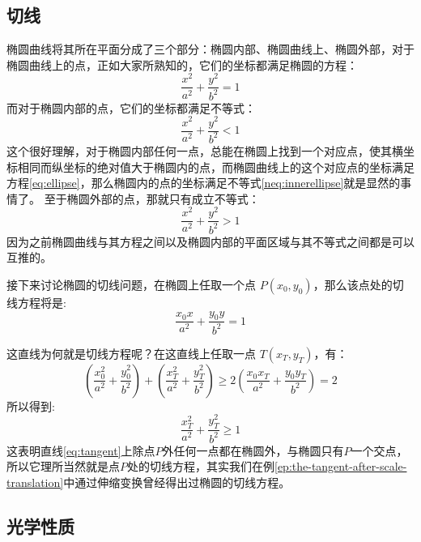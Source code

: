 \subsection{切线}
\label{sec:oval-tangent}

椭圆曲线将其所在平面分成了三个部分：椭圆内部、椭圆曲线上、椭圆外部，对于椭圆曲线上的点，正如大家所熟知的，它们的坐标都满足椭圆的方程：
\begin{equation}
\frac{x^2}{a^2}+\frac{y^2}{b^2}=1 \label{eq:ellipse}
\end{equation}
而对于椭圆内部的点，它们的坐标都满足不等式：
\begin{equation}
\frac{x^2}{a^2}+\frac{y^2}{b^2}<1 \label{neq:innerellipse}
\end{equation}
这个很好理解，对于椭圆内部任何一点，总能在椭圆上找到一个对应点，使其横坐标相同而纵坐标的绝对值大于椭圆内的点，而椭圆曲线上的这个对应点的坐标满足方程\ref{eq:ellipse}，那么椭圆内的点的坐标满足不等式\ref{neq:innerellipse}就是显然的事情了。
至于椭圆外部的点，那就只有成立不等式：
\begin{equation}
\frac{x^2}{a^2}+\frac{y^2}{b^2}>1 \label{neq:outerellipse}
\end{equation}
因为之前椭圆曲线与其方程之间以及椭圆内部的平面区域与其不等式之间都是可以互推的。

接下来讨论椭圆的切线问题，在椭圆上任取一个点 $P(x_0,y_0)$，那么该点处的切线方程将是:
\begin{equation}
\frac{x_0x}{a^2}+\frac{y_0y}{b^2}=1 \label{eq:tangent}
\end{equation}
\begin{center}
\end{center}
这直线为何就是切线方程呢？在这直线上任取一点 $T(x_T,y_T)$，有：
\begin{equation}
(\frac{x_0^2}{a^2}+\frac{y_0^2}{b^2})+(\frac{x_T^2}{a^2}+\frac{y_T^2}{b^2}) \geqslant 2(\frac{x_0x_T}{a^2}+\frac{y_0y_T}{b^2})=2
\end{equation}
所以得到:
\begin{equation}
\frac{x_T^2}{a^2}+\frac{y_T^2}{b^2} \geqslant 1
\end{equation}
这表明直线\ref{eq:tangent}上除点$P$外任何一点都在椭圆外，与椭圆只有$P$一个交点，所以它理所当然就是点$P$处的切线方程，其实我们在例\ref{ep:the-tangent-after-scale-translation}中通过伸缩变换曾经得出过椭圆的切线方程。

\subsection{光学性质}
\label{sec:oval-optical-nature}

